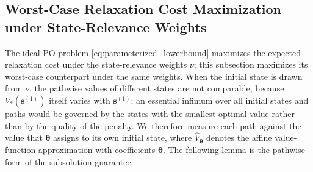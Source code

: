 \documentclass[11pt]{article}
\theoremstyle{definition}
\begin{document}
\subsection{Worst-Case Relaxation Cost Maximization under State-Relevance Weights}

The ideal PO problem \eqref{eq:parameterized_lowerbound} maximizes the expected relaxation cost under the state-relevance weights \(\nu\); this subsection maximizes its worst-case counterpart under the same weights. When the initial state is drawn from \(\nu\), the pathwise values of different states are not comparable, because \(V_*(\boldsymbol{s}^{(1)})\) itself varies with \(\boldsymbol{s}^{(1)}\); an essential infimum over all initial states and paths would be governed by the states with the smallest optimal value rather than by the quality of the penalty. We therefore measure each path against the value that \(\boldsymbol{\theta}\) assigns to its own initial state, where \(\hat V_{\boldsymbol{\theta}}\) denotes the affine value-function approximation with coefficients \(\boldsymbol{\theta}\). The following lemma is the pathwise form of the subsolution guarantee.
\end{document}
